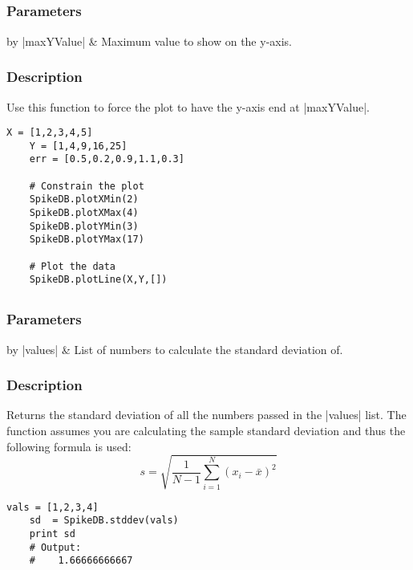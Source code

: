 \documentclass{report}
\begin{document}
\clearpage
\subsection{}
\subsubsection{Parameters}
\begin{table}[h]
\begin{center}
\begin{tabular}{by}
		|maxYValue| & Maximum value to show on the y-axis.\\
	\end{tabular}
\end{center}
\end{table}
\subsubsection{Description}
Use this function to force the plot to have the y-axis end at |maxYValue|.
\begin{lstlisting}[caption=Example]
	X = [1,2,3,4,5]
	Y = [1,4,9,16,25]
	err = [0.5,0.2,0.9,1.1,0.3]

	# Constrain the plot
	SpikeDB.plotXMin(2)
	SpikeDB.plotXMax(4)
	SpikeDB.plotYMin(3)
	SpikeDB.plotYMax(17)

	# Plot the data
	SpikeDB.plotLine(X,Y,[])
\end{lstlisting}


\clearpage
\subsection{}
\subsubsection{Parameters}
\begin{table}[h]
\begin{center}
\begin{tabular}{by}
		|values| & List of numbers to calculate the standard deviation of.\\
	\end{tabular}
\end{center}
\end{table}
\subsubsection{Description}
Returns the standard deviation of all the numbers passed in the |values| list. The function assumes you are calculating the sample standard deviation and thus the following formula is used: 
\[
	s = \sqrt{\frac{1}{N-1}\sum_{i=1}^{N}(x_i-\bar{x})^2}
\]
\begin{lstlisting}[caption=Example]
	vals = [1,2,3,4]
	sd  = SpikeDB.stddev(vals)
	print sd
	# Output:
	#    1.66666666667
\end{lstlisting}
\end{document}
